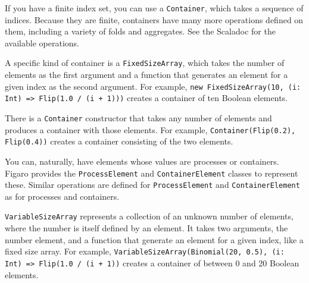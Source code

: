 If you have a finite index set, you can use a \texttt{Container}, which takes a sequence of indices. Because they are finite, containers have many more operations defined on them, including a variety of folds and aggregates. See the Scaladoc for the available operations. 

A specific kind of container is a \texttt{FixedSizeArray}, which takes the number of elements as the first argument and a function that generates an element for a given index as the second argument. For example, \texttt{new FixedSizeArray(10, (i: Int) => Flip(1.0 / (i + 1)))} creates a container of ten Boolean elements. 

There is a \texttt{Container} constructor that takes any number of elements and produces a container with those elements. For example, \texttt{Container(Flip(0.2), Flip(0.4))} creates a container consisting of the two elements.

You can, naturally, have elements whose values are processes or containers. Figaro provides the \texttt{ProcessElement} and \texttt{ContainerElement} classes to represent these. Similar operations are defined for \texttt{ProcessElement} and \texttt{ContainerElement} as for processes and containers.

\texttt{VariableSizeArray} represents a collection of an unknown number of elements, where the number is itself defined by an element. It takes two arguments, the number element, and a function that generate an element for a given index, like a fixed size array. For example, \texttt{VariableSizeArray(Binomial(20, 0.5), (i: Int) => Flip(1.0 / (i + 1))} creates a container of between 0 and 20 Boolean elements.

